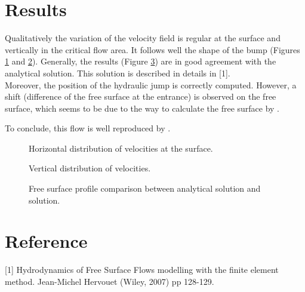 \section{Results}
%
\bigskip
Qualitatively the variation of the velocity field is regular at the surface and
vertically in the critical flow area.
It follows well the shape of the bump (Figures \ref{t3d:bump:fig:veloH} 
and \ref{t3d:bump:fig:veloV}).
Generally, the results (Figure \ref{t3d:bump:fig:free_surface}) 
are in good agreement with the analytical
solution. This solution is described in details in [1].\\
Moreover, the position of the hydraulic jump is correctly computed.
However, a shift (difference of the free surface at the entrance) is
observed on the free surface, which seems to be due to the way to
calculate the free surface by .

%

\bigskip
To conclude, this flow is well reproduced by .
%


\begin{figure}[!htbp]
 \centering
 \caption{Horizontal distribution of velocities at the surface.}
 \label{t3d:bump:fig:veloH}
\end{figure}
\begin{figure}[!htbp]
 \centering
 \caption{Vertical distribution of velocities.}
 \label{t3d:bump:fig:veloV}
\end{figure}


\begin{figure}[!htbp]
 \centering
 \caption{Free surface profile comparison between analytical solution 
 and  solution.}
 \label{t3d:bump:fig:free_surface}
\end{figure}

\section{Reference}
%
[1] Hydrodynamics of Free Surface Flows modelling with the finite
element method. Jean-Michel Hervouet (Wiley, 2007) pp 128-129.
%

%
%
